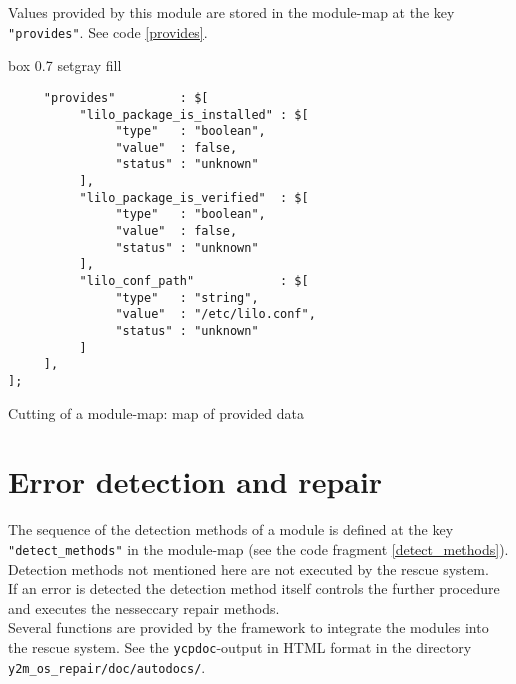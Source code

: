 Values provided by this module are stored in the module-map at the key
\verb+"provides"+. See code \ref{provides}.

\begin{program}[h!]
\begin{boxitpara}{box 0.7 setgray fill}
{\footnotesize \begin{verbatim}
     "provides"         : $[
          "lilo_package_is_installed" : $[
               "type"   : "boolean",
               "value"  : false,
               "status" : "unknown"
          ],
          "lilo_package_is_verified"  : $[
               "type"   : "boolean",
               "value"  : false,
               "status" : "unknown"
          ],
          "lilo_conf_path"            : $[
               "type"   : "string",
               "value"  : "/etc/lilo.conf",
               "status" : "unknown"
          ]
     ],
];
\end{verbatim}}
\end{boxitpara}
\caption{Cutting of a module-map: map of provided data}
\label{provides}
\end{program}

\section{Error detection and repair}
The sequence of the detection methods of a module is defined 
at the key \verb+"detect_methods"+ in the module-map (see the code
fragment \ref{detect_methods}). Detection methods not
mentioned here are not executed by the rescue system.\\

If an error is detected the detection method itself controls the further
procedure and executes the nesseccary repair methods.\\

Several functions are provided by the framework to integrate the modules
into the rescue system. See the {\tt ycpdoc}-output in HTML format in the
directory {\tt y2m\_os\_repair/doc/autodocs/}.
